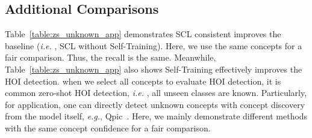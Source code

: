 \documentclass[runningheads]{llncs}
\newcommand{\ie}{\textit{i.e. }}
\newcommand{\eg}{\textit{e.g.}}
\begin{document}
\subsection{Additional Comparisons}
Table~\ref{table:zs_unknown_app} demonstrates SCL consistent improves the baseline (\ie, SCL without Self-Training). Here, we use the same concepts for a fair comparison. Thus, the recall is the same. Meanwhile, Table~\ref{table:zs_unknown_app} also shows Self-Training effectively improves the HOI detection. when we select all concepts to evaluate HOI detection, it is common zero-shot HOI detection, \ie, all unseen classes are known. Particularly, for application, one can directly detect unknown concepts with concept discovery from the model itself, \eg, Qpic~\cite{tamura_cvpr2021}. Here, we mainly demonstrate different methods with the same concept confidence for a fair comparison.
\end{document}
